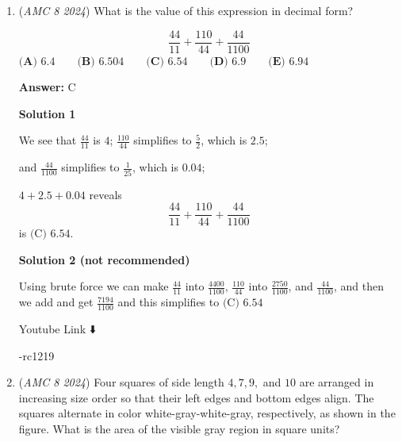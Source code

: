 \begin{enumerate}
\textbf{Solution 6}

We can ignore the other digits and just do $22-2-2-2-2-2$. Because you are subtracting five $2s$ and $2\cdot5 = 10$, you subtract $10$ from $22$. This gives us 12, so the last digit is $\boxed{\textbf{(B) } 2}$.

 



\textbf{Solution 7}

So using the last digits 2-2-2-2-2-2 = -8 right and 10-8 would be 2 so the answer would be $\boxed{\textbf{(B) } 2}$, this is a speed strategy so do not use unless you have 2 seconds left ~Aarnavisthebest

 Youtube Link ⬇️

 -rc1219

 


 


	\item (\textit{AMC 8 2024}) What is the value of this expression in decimal form?

 \[\frac{44}{11} + \frac{110}{44} + \frac{44}{1100}\]
$\textbf{(A) } 6.4\qquad\textbf{(B) } 6.504\qquad\textbf{(C) } 6.54\qquad\textbf{(D) } 6.9\qquad\textbf{(E) } 6.94$

 \textbf{Answer: }C



\textbf{Solution 1}

We see that $\frac{44}{11}$ is $4$; $\frac{110}{44}$ simplifies to $\frac{5}{2}$, which is $2.5$; 

 and $\frac{44}{1100}$ simplifies to $\frac{1}{25}$, which is $0.04$; 

 $4+2.5+0.04$ reveals 
 \[\frac{44}{11} + \frac{110}{44} + \frac{44}{1100}\] is $\boxed{\text{(C)\ 6.54}}$. ~ 

 



\textbf{Solution 2 (not recommended)}

Using brute force we can make $\frac{44}{11}$ into $\frac{4400}{1100}$, $\frac{110}{44}$ into $\frac{2750}{1100}$, and $\frac{44}{1100}$, and then we add and get $\frac{7194}{1100}$ and this simplifies to $\boxed{\text{(C)\ 6.54}}$

 Youtube Link ⬇️

 -rc1219

 


	\item (\textit{AMC 8 2024}) Four squares of side length $4, 7, 9,$ and $10$ are arranged in increasing size order so that their left edges and bottom edges align. The squares alternate in color white-gray-white-gray, respectively, as shown in the figure. What is the area of the visible gray region in square units?


\end{enumerate}
